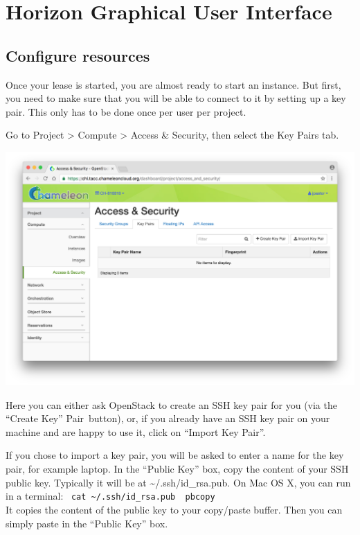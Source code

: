\FILENAME

\chapter{Horizon Graphical User Interface}
\label{C:cc-horizon}

\section{Configure resources}

Once your lease is started, you are almost ready to start an instance.
But first, you need to make sure that you will be able to connect to
it by setting up a key pair. This only has to be done once per user
per project.

Go to Project \textgreater{} Compute \textgreater{} Access \& Security,
then select the Key Pairs tab.

\includegraphics[width=0.8\columnwidth]{images/chameleon/Screen-Shot-2016-10-26-at-14-37-00.png}

Here you can either ask OpenStack to create an SSH key pair for you (via
the ``Create Key'' Pair~button), or, if you already have an SSH key pair
on your machine and are happy to use it, click on ``Import Key Pair''.

If you chose to import a key pair, you will be asked to enter a name for
the key pair, for example laptop. In the ``Public Key'' box, copy the
content of your SSH public key. Typically it will be at
\textasciitilde{}/.ssh/id\_rsa.pub. On Mac OS X, you can run in a
terminal:
~\texttt{cat\ \textasciitilde{}/.ssh/id\_rsa.pub\ \textbar{}\ pbcopy}\\
It copies the content of the public key to your copy/paste buffer. Then
you can simply paste in the ``Public Key'' box.

